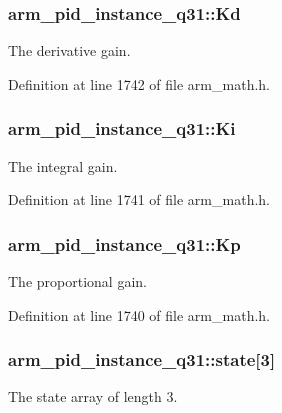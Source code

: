 \hypertarget{structarm__pid__instance__q31_aab4ff371d14441df501f1169f71cbd17}{
\subsubsection[{Kd}]{ arm\-\_\-pid\-\_\-instance\-\_\-q31\-::\-Kd}}\label{structarm__pid__instance__q31_aab4ff371d14441df501f1169f71cbd17}
The derivative gain. 

Definition at line 1742 of file arm\-\_\-math.\-h.

\hypertarget{structarm__pid__instance__q31_aa861d69fd398f29aa0b4b455a823ed72}{
\subsubsection[{Ki}]{ arm\-\_\-pid\-\_\-instance\-\_\-q31\-::\-Ki}}\label{structarm__pid__instance__q31_aa861d69fd398f29aa0b4b455a823ed72}
The integral gain. 

Definition at line 1741 of file arm\-\_\-math.\-h.

\hypertarget{structarm__pid__instance__q31_ac2410bf7f856d58dc1d773d4983cac8e}{
\subsubsection[{Kp}]{ arm\-\_\-pid\-\_\-instance\-\_\-q31\-::\-Kp}}\label{structarm__pid__instance__q31_ac2410bf7f856d58dc1d773d4983cac8e}
The proportional gain. 

Definition at line 1740 of file arm\-\_\-math.\-h.

\hypertarget{structarm__pid__instance__q31_a228e4a64da6014844a0a671a1fa391d4}{
\subsubsection[{state}]{ arm\-\_\-pid\-\_\-instance\-\_\-q31\-::state\mbox{[}3\mbox{]}}}\label{structarm__pid__instance__q31_a228e4a64da6014844a0a671a1fa391d4}
The state array of length 3. 

